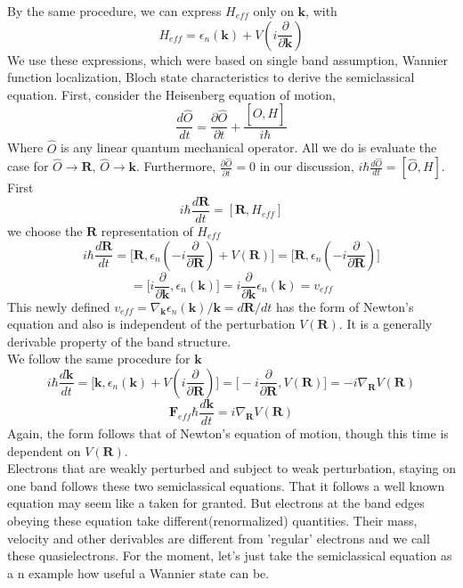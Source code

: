 \documentclass{article}
\begin{document}
By the same procedure, we can express $H_{eff}$ only on $\mathbf{k}$, with
$$H_{eff}=\epsilon_n(\mathbf{k})+V\left(i\frac{\partial}{\partial\mathbf{k}}\right)$$
We use these expressions, which were based on single band assumption, Wannier function localization, Bloch state characteristics to derive the semiclassical equation. First, consider the Heisenberg equation of motion,
$$\frac{d\hat{O}}{dt}=\frac{\partial\hat{O}}{\partial t}+\frac{[\hat{O},H]}{i\hbar}$$
Where $\hat{O}$ is any linear quantum mechanical operator. All we do is evaluate the case for $\hat{O}\to\mathbf{R}$, $\hat{O}\to\mathbf{k}$. Furthermore, $\frac{\partial\hat{O}}{\partial t}=0$ in our discussion, $i\hbar\frac{d\hat{O}}{dt}=[\hat{O},H]$. First
$$i\hbar\frac{d\mathbf{R}}{dt}=[\mathbf{R},H_{eff}]$$
we choose the $\mathbf{R}$ representation of $H_{eff}$
$$i\hbar\frac{d\mathbf{R}}{dt}=\Biggl[\mathbf{R},\epsilon_n\left(-i\frac{\partial}{\partial\mathbf{R}}\right)+V(\mathbf{R})\Biggr]=\Biggl[\mathbf{R},\epsilon_n\left(-i\frac{\partial}{\partial\mathbf{R}}\right)\Biggr]$$
\begin{equation}
	=\Biggl[i\frac{\partial}{\partial\mathbf{k}},\epsilon_n(\mathbf{k})\Biggr]=i\frac{\partial}{\partial\mathbf{k}}\epsilon_n(\mathbf{k})=v_{eff} \label{semione}
\end{equation}
This newly defined $v_{eff}=\nabla_{\mathbf{k}}\epsilon_n(\mathbf{k})/\mathbf{k}=d\mathbf{R}/dt$ has the form of Newton's equation and also is independent of the perturbation $V(\mathbf{R})$. It is a generally derivable property of the band structure.\\
We follow the same procedure for $\mathbf{k}$
$$i\hbar\frac{d\mathbf{k}}{dt}=\Biggl[\mathbf{k},\epsilon_n(\mathbf{k})+V\left(i\frac{\partial}{\partial\mathbf{R}}\right)\Biggr]=\Biggl[-i\frac{\partial}{\partial \mathbf{R}},V(\mathbf{R})\Biggr]=-i\nabla_{\mathbf{R}}V(\mathbf{R})$$
\begin{equation}
	\mathbf{F}_{eff}\hbar\frac{d\mathbf{k}}{dt}=i\nabla_{\mathbf{R}}V(\mathbf{R}) \label{semitwo}
\end{equation}
Again, the form follows that of Newton's equation of motion, though this time is dependent on $V(\mathbf{R})$.\\
Electrons that are weakly perturbed and subject to weak perturbation, staying on one band follows these two semiclassical equations. That it follows a well known equation may seem like a taken for granted. But electrons at the band edges obeying these equation take different(renormalized) quantities. Their mass, velocity and other derivables are different from 'regular' electrons and we call these quasielectrons. For the moment, let's just take the semiclassical equation as a n example how useful a Wannier state can be.
\end{document}
